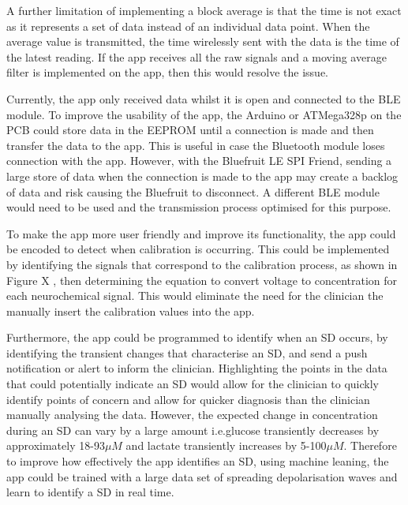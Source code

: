 A further limitation of implementing a block average is that the time is not exact as it represents a set of data instead of an individual data point. When the average value is transmitted, the time wirelessly sent with the data is the time of the latest reading. If the app receives all the raw signals and a moving average filter is implemented on the app, then this would resolve the issue.

Currently, the app only received data whilst it is open and connected to the BLE module. To improve the usability of the app, the Arduino or ATMega328p on the PCB could store data in the EEPROM until a connection is made and then transfer the data to the app. This is useful in case the Bluetooth module loses connection with the app. However, with the Bluefruit LE SPI Friend, sending a large store of data when the connection is made to the app may create a backlog of data and risk causing the Bluefruit to disconnect. A different BLE module would need to be used and the transmission process optimised for this purpose.

To make the app more user friendly and improve its functionality, the app could be encoded to detect when calibration is occurring. This could be implemented by identifying the signals that correspond to the calibration process, as shown in Figure X %
, then determining the equation to convert voltage to concentration for each neurochemical signal. This would eliminate the need for the clinician the manually insert the calibration values into the app.

Furthermore, the app could be programmed to identify when an SD occurs, by identifying the transient changes that characterise an SD, and send a push notification or alert to inform the clinician. Highlighting the points in the data that could potentially indicate an SD would allow for the clinician to quickly identify points of concern and allow for quicker diagnosis than the clinician manually analysing the data. However, the expected change in concentration during an SD can vary by a large amount i.e.glucose transiently decreases by approximately 18-93$\mu M$ and lactate transiently increases by 5-100$\mu M$. Therefore to improve how effectively the app identifies an SD, using machine leaning, the app could be trained with a large data set of spreading depolarisation waves and learn to identify a SD in real time. 

